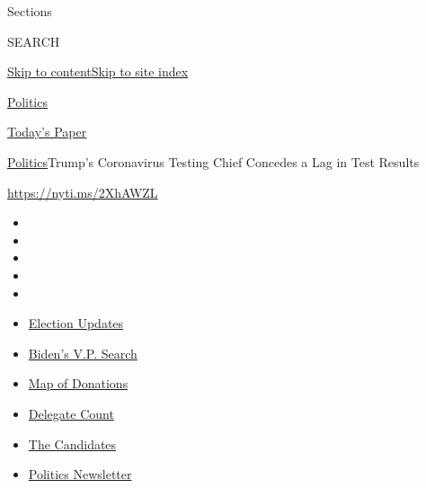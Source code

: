 Sections

SEARCH

\protect\hyperlink{site-content}{Skip to
content}\protect\hyperlink{site-index}{Skip to site index}

\href{https://www.nytimes3xbfgragh.onion/section/politics}{Politics}

\href{https://myaccount.nytimes3xbfgragh.onion/auth/login?response_type=cookie\&client_id=vi}{}

\href{https://www.nytimes3xbfgragh.onion/section/todayspaper}{Today's
Paper}

\href{/section/politics}{Politics}\textbar{}Trump's Coronavirus Testing
Chief Concedes a Lag in Test Results

\url{https://nyti.ms/2XhAWZL}

\begin{itemize}
\item
\item
\item
\item
\item
\end{itemize}

\begin{itemize}
\item
  \href{https://www.nytimes3xbfgragh.onion/2020/07/31/us/elections/biden-vs-trump.html?action=click\&pgtype=Article\&state=default\&region=TOP_BANNER\&context=storylines_menu}{Election
  Updates}
\item
  \href{https://www.nytimes3xbfgragh.onion/article/biden-vice-president-2020.html?action=click\&pgtype=Article\&state=default\&region=TOP_BANNER\&context=storylines_menu}{Biden's
  V.P. Search}
\item
  \href{https://www.nytimes3xbfgragh.onion/interactive/2020/07/24/us/politics/trump-biden-campaign-donors.html?action=click\&pgtype=Article\&state=default\&region=TOP_BANNER\&context=storylines_menu}{Map
  of Donations}
\item
  \href{https://www.nytimes3xbfgragh.onion/interactive/2020/us/elections/delegate-count-primary-results.html?action=click\&pgtype=Article\&state=default\&region=TOP_BANNER\&context=storylines_menu}{Delegate
  Count}
\item
  \href{https://www.nytimes3xbfgragh.onion/interactive/2019/us/politics/2020-presidential-candidates.html?action=click\&pgtype=Article\&state=default\&region=TOP_BANNER\&context=storylines_menu}{The
  Candidates}
\item
  \href{https://www.nytimes3xbfgragh.onion/newsletters/politics?action=click\&pgtype=Article\&state=default\&region=TOP_BANNER\&context=storylines_menu}{Politics
  Newsletter}
\end{itemize}

